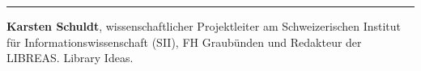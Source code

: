 \begin{center}\rule{0.5\linewidth}{0.5pt}\end{center}

\textbf{Karsten Schuldt}, wissenschaftlicher Projektleiter am
Schweizerischen Institut für Informationswissenschaft (SII), FH
Graubünden und Redakteur der LIBREAS. Library Ideas.
